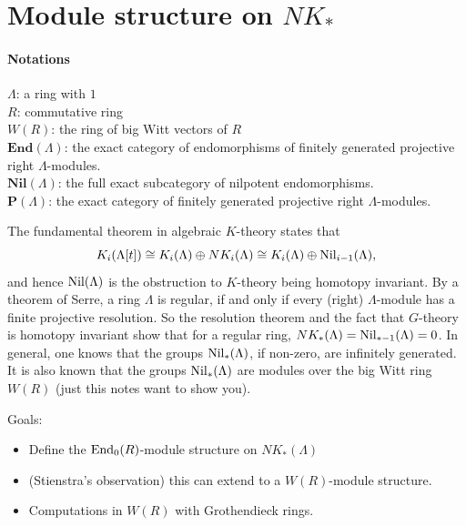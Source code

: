 \section{Module structure on $NK_*$} %
\label{sec:module_structure_on_}
\paragraph{Notations} $\Lambda$: a ring with $1$\\
$R$: commutative ring \\
$W(R)$: the ring of big Witt vectors of $R$\\
$\mathbf{End}(\Lambda)$: the exact category of endomorphisms of finitely generated projective right $\Lambda$-modules.\\
$\mathbf{Nil}(\Lambda)$: the full exact subcategory of nilpotent endomorphisms.\\
$\mathbf{P}(\Lambda)$: the exact category of finitely generated projective right $\Lambda$-modules.

The fundamental theorem in algebraic $K$-theory states that
\[K_i(\Lambda[t])\cong K_i(\Lambda)\oplus NK_i(\Lambda)\cong K_i(\Lambda)\oplus \mathrm{Nil}_{i-1}(\Lambda),\]
and hence $\mathrm{Nil}(\Lambda)$ is the obstruction to $K$-theory being homotopy invariant. By a theorem of Serre, a ring $\Lambda$ is regular, if and only if every (right) $\Lambda$-module has a finite projective resolution. So the resolution theorem and the fact that $G$-theory is homotopy invariant show that for a regular ring, $NK_
*(\Lambda)=\mathrm{Nil}_{*-1}(\Lambda) = 0$. In general, one knows that the groups $\mathrm{Nil}_*(\Lambda)$, if non-zero, are infinitely generated. It is also known that the groups $\mathrm{Nil}_*(\Lambda)$ are modules over the big Witt ring $W(R)$ (just this notes want to show you).

Goals:
\begin{itemize}
	\item Define the $\mathrm{End}_0(R)$-module structure on $NK_*(\Lambda)$ 
	\item (Stienstra's observation) this can extend to a $W(R)$-module structure.
	\item Computations in $W(R)$ with Grothendieck rings.
\end{itemize}
